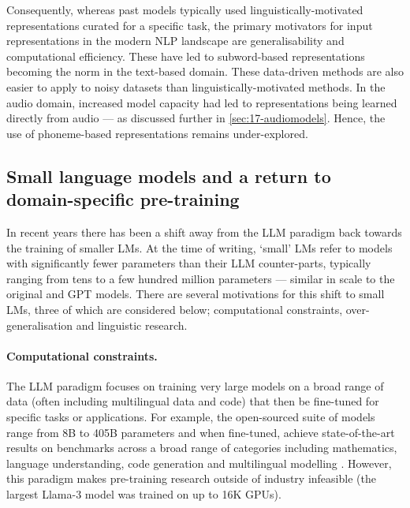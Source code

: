
Consequently, whereas past models typically used linguistically-motivated representations curated for a specific task, the primary motivators for input representations in the modern NLP landscape are generalisability and computational efficiency. These have led to subword-based representations becoming the norm in the text-based domain. These data-driven methods are also easier to apply to noisy datasets than linguistically-motivated methods. In the audio domain, increased model capacity had led to representations being learned directly from audio --- as discussed further in \cref{sec:17-audiomodels}. Hence, the use of phoneme-based representations remains under-explored. 


\subsection{Small language models and a return to domain-specific pre-training}\label{sec:12-domainspecific}

In recent years there has been a shift away from the LLM paradigm back towards the training of smaller LMs. At the time of writing, `small' LMs  refer to models with significantly fewer parameters than their LLM counter-parts, typically ranging from tens to a few hundred million parameters --- similar in scale to the original \bert and GPT models. There are several motivations for this shift to small LMs, three of which are considered below; computational constraints, over-generalisation and linguistic research.

\paragraph{Computational constraints.} The LLM paradigm focuses on training very large models on a broad range of data (often including multilingual data and code) that then be fine-tuned for specific tasks or applications. For example, the open-sourced  suite of models range from 8B to 405B parameters and when fine-tuned, achieve state-of-the-art results on benchmarks across a broad range of categories including mathematics, language understanding, code generation and multilingual modelling \citep{grattafiori2024llama}. However, this paradigm makes pre-training research outside of industry infeasible (the largest Llama-3 model was trained on up to 16K GPUs).

